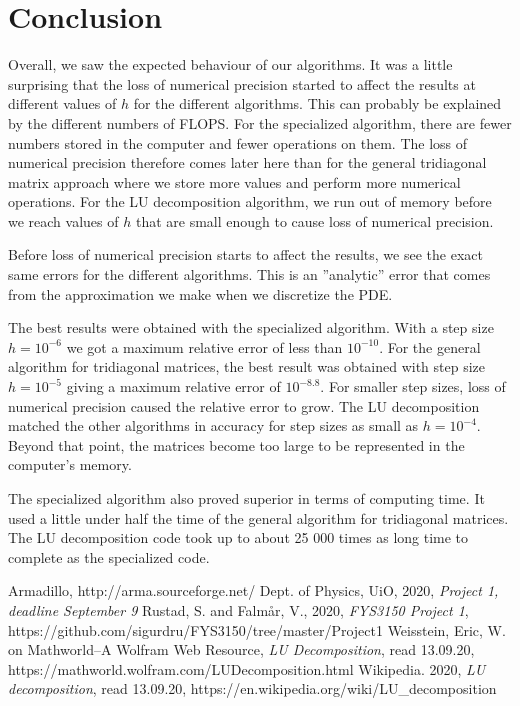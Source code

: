 \documentclass[reprint, english,notitlepage]{revtex4-1}  %
\begin{document}
\section{Conclusion}

Overall, we saw the expected behaviour of our algorithms. It was a little surprising that the loss of numerical precision started to affect the results at different values of $h$ for the different algorithms. This can probably be explained by the different numbers of FLOPS. For the specialized algorithm, there are fewer numbers stored in the computer and fewer operations on them. The loss of numerical precision therefore comes later here than for the general tridiagonal matrix approach where we store more values and perform more numerical operations. For the LU decomposition algorithm, we run out of memory before we reach values of $h$ that are small enough to cause loss of numerical precision.

Before loss of numerical precision starts to affect the results, we see the exact same errors for the different algorithms. This is an ''analytic'' error that comes from the approximation we make when we discretize the PDE.

The best results were obtained with the specialized algorithm. With a step size $h = 10^{-6}$ we got a maximum relative error of less than $10^{-10}$. For the general algorithm for tridiagonal matrices, the best result was obtained with step size $h = 10^{-5}$ giving a maximum relative error of $10^{-8.8}$. For smaller step sizes, loss of numerical precision caused the relative error to grow. The LU decomposition matched the other algorithms in accuracy for step sizes as small as $h = 10^{-4}$. Beyond that point, the matrices become too large to be represented in the computer's memory.

The specialized algorithm also proved superior in terms of computing time. It used a little under half the time of the general algorithm for tridiagonal matrices. The LU decomposition code took up to about 25 000 times as long time to complete as the specialized code.



\onecolumngrid
\vspace{1cm} %
\newpage

\begin{thebibliography}{}
   Armadillo, http://arma.sourceforge.net/
   Dept. of Physics, UiO,  2020, \textit{Project 1, deadline September 9}
   Rustad, S. and Falmår, V.,  2020, \textit{FYS3150 Project 1}, https://github.com/sigurdru/FYS3150/tree/master/Project1
   Weisstein, Eric, W. on Mathworld--A Wolfram Web Resource, \textit{LU Decomposition}, read 13.09.20, https://mathworld.wolfram.com/LUDecomposition.html
   Wikipedia.  2020, \textit{LU decomposition}, read 13.09.20, https://en.wikipedia.org/wiki/LU\_decomposition
\end{thebibliography}
\end{document}
